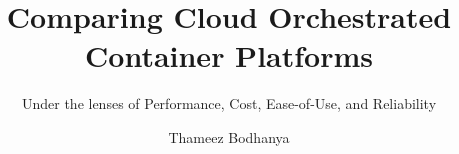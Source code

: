\documentclass[aspectratio=169,10pt]{uu-beamer}
\title{Comparing Cloud Orchestrated Container Platforms}
\subtitle{Under the lenses of Performance, Cost, Ease-of-Use, and Reliability}
\author[TA. Bodhanya]{Thameez Bodhanya}
\institute[UU]{Uppsala Universitet}
\begin{document}
\logopage

\titlepage







\end{document}
